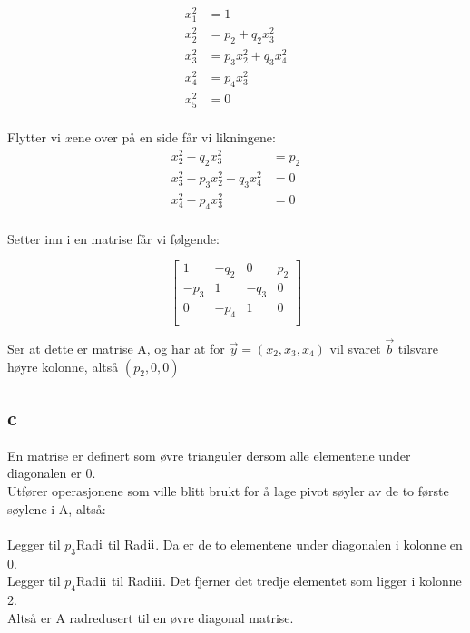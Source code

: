 \documentclass[a4paper, norsk, twoside, 10pt]{article}
\newcommand{\RN}[1]{
  \textup{\uppercase\expandafter{\romannumeral#1}}%
}
\begin{document}
\begin{flushleft}
   \begin{align*}
     x_{1}^{2} &= 1 \\
     x_{2}^{2} &= p_{2} + q_{2}x_{3}^{2} \\
     x_{3}^{2} &= p_{3}x_{2}^{2} + q_{3}x_{4}^{2}\\
     x_{4}^{2} &= p_{4}x_{3}^{2}\\
     x_{5}^{2} &= 0 \\
   \end{align*}   

   Flytter vi $x$ene over på en side får vi likningene:
   \begin{align*}
     x_{2}^{2}  - q_{2}x_{3}^{2} &= p_{2}\\
     x_{3}^{2} - p_{3}x_{2}^{2} - q_{3}x_{4}^{2}&= 0\\
     x_{4}^{2} - p_{4}x_{3}^{2} &= 0\\
   \end{align*}   
   
   Setter inn i en matrise får vi følgende:

   \[\begin{bmatrix}
   1 & - q_{2} & 0 & p_{2}\\
   -p_{3} & 1 & -q_{3} & 0 \\
   0 & -p_{4} & 1 & 0 \\
   \end{bmatrix}\]

   Ser at dette er matrise A, og har at for $\vec{y} = (x_{2}, x_{3}, x_{4})$ vil svaret $\vec{b}$ tilsvare høyre kolonne, altså $(p_{2}, 0, 0)$



   \subsection*{c}
   En matrise er definert som øvre trianguler dersom alle elementene under diagonalen er 0. \\

   Utfører operasjonene som ville blitt brukt for å lage pivot søyler av de to første søylene i A, altså: \\ \ \\
   Legger til $p_{3}$Rad$\RN{1}$ til Rad$\RN{2}$. Da er de to elementene under diagonalen i kolonne en 0.\\
   Legger til $p_{4}$Rad$\RN{2}$ til Rad$\RN{3}$. Det fjerner det tredje elementet som ligger i kolonne 2.
   \\
   Altså er A radredusert til en øvre diagonal matrise.
   
  \end{flushleft}
\end{document}

